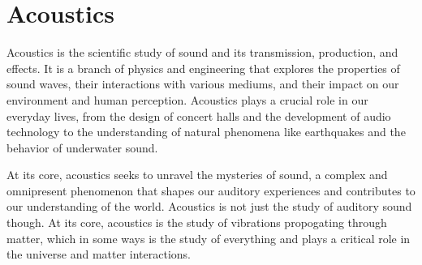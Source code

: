 \chapter{Acoustics}
\thispagestyle{fancy}

Acoustics is the scientific study of sound and its transmission, production, and effects. It is a branch of physics and engineering that explores the properties of sound waves, their interactions with various mediums, and their impact on our environment and human perception. Acoustics plays a crucial role in our everyday lives, from the design of concert halls and the development of audio technology to the understanding of natural phenomena like earthquakes and the behavior of underwater sound.

At its core, acoustics seeks to unravel the mysteries of sound, a complex and omnipresent phenomenon that shapes our auditory experiences and contributes to our understanding of the world. Acoustics is not just the study of auditory sound though. At its core, acoustics is the study of vibrations propogating through matter, which in some ways is the study of everything and plays a critical role in the universe and matter interactions.
